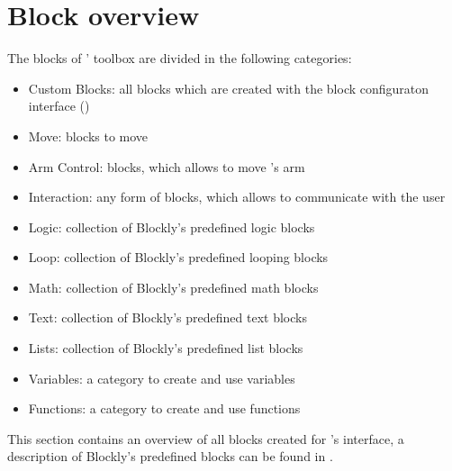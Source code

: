 \chapter{Block overview} \label{apx:BlockOverview}
The blocks of \toolname{}' toolbox are divided in the following categories:

\begin{itemize}
    \item Custom Blocks: all blocks which are created with the block configuraton interface ()
    \item Move: blocks to move \hobbit{}
    \item Arm Control: blocks, which allows to move \hobbit{}'s arm
    \item Interaction: any form of blocks, which allows \hobbit{} to communicate with the user
    \item Logic: collection of Blockly's predefined logic blocks
    \item Loop: collection of Blockly's predefined looping blocks
    \item Math: collection of Blockly's predefined math blocks
    \item Text: collection of Blockly's predefined text blocks
    \item Lists: collection of Blockly's predefined list blocks
    \item Variables: a category to create and use variables
    \item Functions: a category to create and use functions
\end{itemize}

This section contains an overview of all blocks created for \hobbit{}'s interface, a description of Blockly's predefined blocks can be found in \cite{BlocklyBlockWiki}.

